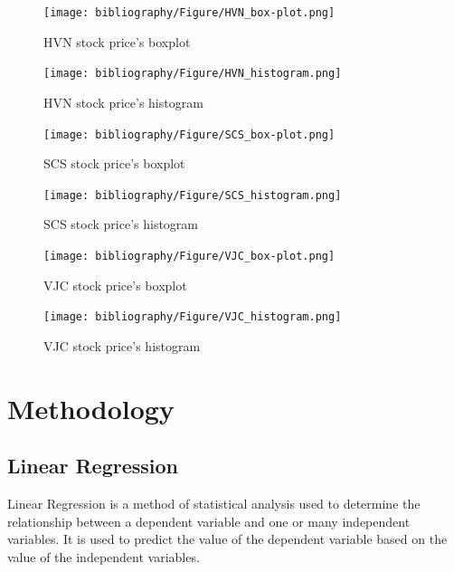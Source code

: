 \documentclass{ieeeojies}
\begin{document}
\begin{figure}[H]
    \centering
    \begin{minipage}{0.23\textwidth}
    \centering
    \texttt{[image: bibliography/Figure/HVN\_box-plot.png]}
    \caption{HVN stock price's boxplot}
    \label{fig:1}
    \end{minipage}
    \hfill
    \begin{minipage}{0.23\textwidth}
    \centering
    \texttt{[image: bibliography/Figure/HVN\_histogram.png]}
    \caption{HVN stock price's histogram}
    \label{fig:2}
    \end{minipage}
\end{figure}

\begin{figure}[H]
    \centering
    \begin{minipage}{0.23\textwidth}
    \centering
    \texttt{[image: bibliography/Figure/SCS\_box-plot.png]}
    \caption{SCS stock price's boxplot}
    \label{fig:1}
    \end{minipage}
    \hfill
    \begin{minipage}{0.23\textwidth}
    \centering
    \texttt{[image: bibliography/Figure/SCS\_histogram.png]}
    \caption{SCS stock price's histogram}
    \label{fig:2}
    \end{minipage}
\end{figure}

\begin{figure}[H]
    \centering
    \begin{minipage}{0.23\textwidth}
    \centering
    \texttt{[image: bibliography/Figure/VJC\_box-plot.png]}
    \caption{VJC stock price's boxplot}
    \label{fig:1}
    \end{minipage}
    \hfill
    \begin{minipage}{0.23\textwidth}
    \centering
    \texttt{[image: bibliography/Figure/VJC\_histogram.png]}
    \caption{VJC stock price's histogram}
    \label{fig:2}
    \end{minipage}
\end{figure}

\section{Methodology}
\subsection{Linear Regression}
Linear Regression is a method of statistical analysis used to determine the relationship between a dependent variable and one or many independent variables. It is used to predict the value of the dependent variable based on the value of the independent variables.
\end{document}
